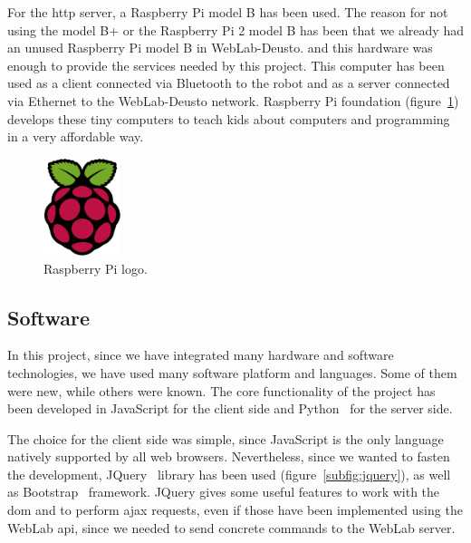 For the \acrshort{http} server, a Raspberry Pi model B has been used. The reason for not using the
model B+ or the Raspberry Pi 2 model B has been that we already had an unused Raspberry Pi model B
in WebLab-Deusto. and this hardware was enough to provide the services needed by this project. This
computer has been used as a client connected via Bluetooth to the robot and as a server connected
via Ethernet to the WebLab-Deusto network. Raspberry Pi foundation (figure~\ref{fig:rasp_logo})
develops these tiny computers to teach kids about computers and programming in a very affordable
way.

\begin{figure}[!htbp]
	\centering
	\includegraphics[width=0.2\textwidth]{fig/rasp-logo}
	\caption{Raspberry Pi logo.}
	\label{fig:rasp_logo}
\end{figure}

\subsection{Software}

In this project, since we have integrated many hardware and software technologies, we have used many
software platform and languages. Some of them were new, while others were known. The core
functionality of the project has been developed in JavaScript for the client side and
Python~\cite{python_web} for the server side.

The choice for the client side was simple, since JavaScript is the only language natively supported
by all web browsers. Nevertheless, since we wanted to fasten the development,
JQuery~\cite{jquery_web} library has been used (figure~\ref{subfig:jquery}), as well as
Bootstrap~\cite{bootstrap_web} framework. JQuery gives some useful features to work with the
\acrshort{dom} and to perform \acrshort{ajax} requests, even if those have been implemented using
the WebLab \acrshort{api}, since we needed to send concrete commands to the WebLab server.

